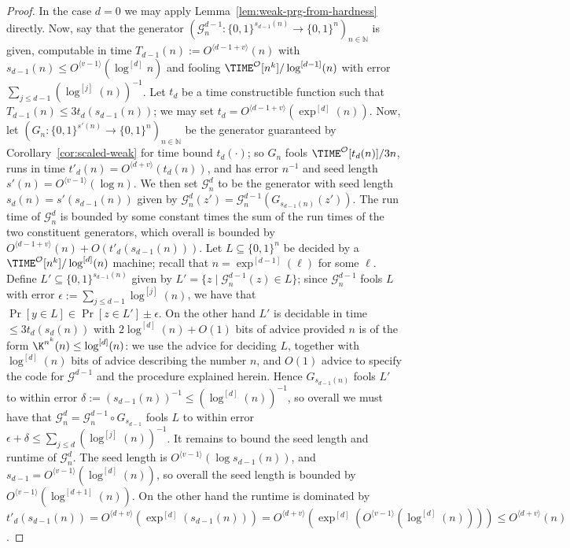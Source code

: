 \documentclass[11pt]{article}
\newcommand{\B}{\{0,1\}}
\newcommand{\od}[1]{O^{\langle #1 \rangle}}
\begin{document}
\begin{proof}
In the case $d = 0$ we may apply Lemma~\ref{lem:weak-prg-from-hardness} directly. Now, say that the generator $(\mathcal{G}^{d-1}_n: \B^{s_{d-1}(n)} \to \B^n)_{n \in \mathbb{N}}$ is given, computable in time $T_{d-1}(n) := \od{d-1+v}(n)$ with $s_{d-1}(n) \leq \od{v-1}(\log^{[d]}n)$ and fooling $\TIME^\mathcal{O}[n^k]/\log^{[d-1]}(n)$ with error $\sum_{j \leq d-1} (\log^{[j]}(n))^{-1}$. Let $t_{d}$ be a time constructible function such that $T_{d-1}(n) \leq 3t_{d}(s_{d-1}(n))$; we may set $t_{d} = \od{d-1+v}(\exp^{[d]}(n))$. Now, let $(G_n: \B^{s'(n)} \to \B^n)_{n \in \mathbb{N}}$ be the generator guaranteed by Corollary~\ref{cor:scaled-weak} for time bound $t_d(\cdot)$; so $G_n$ fools $\TIME^\mathcal{O}[t_d(n)]/3n$, runs in time $t'_d(n) = \od{d+v}(t_d(n))$, and has error $n^{-1}$ and seed length $s'(n) = \od{v-1}(\log n)$. We then set $\mathcal{G}^d_n$ to be the generator with seed length $s_d(n) = s'(s_{d-1}(n))$ given by $\mathcal{G}^d_n(z') = \mathcal{G}_n^{d-1}(G_{s_{d-1}(n)}(z'))$. The run time of $\mathcal{G}^{d}_n$ is bounded by some constant times the sum of the run times of the two constituent generators, which overall is bounded by $\od{d-1+v}(n) + O(t'_d(s_{d-1}(n)))$. Let $L \subseteq \B^n$ be decided by a $\TIME^\mathcal{O}[n^k]/\log^{[d]}(n)$ machine; recall that $n = \exp^{[d-1]}(\ell)$ for some $\ell$. Define $L' \subseteq \B^{s_{d-1}(n)}$ given by $L' = \{z \mid \mathcal{G}^{d-1}_n(z) \in L\}$; since $\mathcal{G}^{d-1}_n$ fools $L$ with error $\epsilon := \sum_{j \leq d-1}\log^{[j]}(n)$, we have that $\Pr[y \in L] \in  \Pr[z \in L'] \pm \epsilon$. On the other hand $L'$ is decidable in time $\leq 3t_d(s_d(n))$ with $2 \log^{[d]}(n) + O(1)$ bits of advice provided $n$ is of the form $\K^{n^k}(n) \leq \log^{[d]}(n)$: we use the advice for deciding $L$, together with $\log^{[d]}(n)$ bits of advice describing the number $n$, and $O(1)$ advice to specify the code for $\mathcal{G}^{d-1}$ and the procedure explained herein. Hence $G_{s_{d-1}(n)}$ fools $L'$ to within error $\delta:= (s_{d-1}(n))^{-1} \leq (\log^{[d]}(n))^{-1}$, so overall we must have that $\mathcal{G}^d_n = \mathcal{G}^{d-1}_n \circ G_{s_{d-1}}$ fools $L$ to within error $\epsilon + \delta \leq \sum_{j \leq d} (\log^{[j]}(n))^{-1}$. It remains to bound the seed length and runtime of $\mathcal{G}^d_n$. The seed length is $\od{v-1}(\log s_{d-1}(n))$, and $s_{d-1} = \od{v-1}(\log^{[d]}(n))$, so overall the seed length is bounded by $\od{v-1}(\log^{[d+1]}(n))$. On the other hand the runtime is dominated by $t'_d(s_{d-1}(n)) = \od{d+v}(\exp^{[d]}(s_{d-1}(n))) = \od{d+v}(\exp^{[d]}(\od{v-1}(\log^{[d]}(n)))) \leq \od{d+v}(n)$.


\end{proof}
\end{document}
